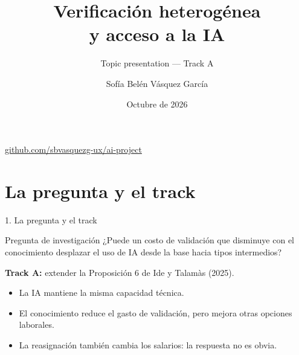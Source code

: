 \documentclass[aspectratio=169,11pt]{beamer}
\title[Verificación heterogénea y acceso a la IA]{Verificación heterogénea\\y acceso a la IA}
\subtitle{Topic presentation --- Track A}
\author{Sofía Belén Vásquez García}
\date{Octubre de 2026}
\begin{document}
\begin{frame}[plain]
\titlepage
\begin{center}\small\href{https://github.com/sbvasquezg-ux/ai-project}{github.com/sbvasquezg-ux/ai-project}\end{center}
\end{frame}
\section{La pregunta y el track}
\begin{frame}{1. La pregunta y el track}
\begin{block}{Pregunta de investigación}
¿Puede un costo de validación que disminuye con el conocimiento desplazar el uso de IA desde la base hacia tipos intermedios?
\end{block}
\medskip
\textbf{Track A:} extender la Proposición 6 de Ide y Talamàs (2025).
\begin{itemize}
\item La IA mantiene la misma capacidad técnica.
\item El conocimiento reduce el gasto de validación, pero mejora otras opciones laborales.
\item La reasignación también cambia los salarios: la respuesta no es obvia.
\end{itemize}
\end{frame}
\end{document}
